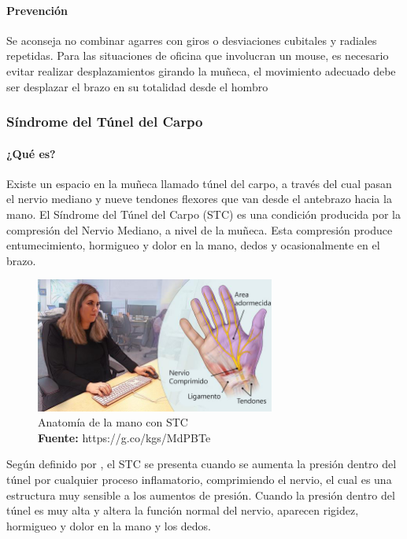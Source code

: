\paragraph{Prevención}
Se aconseja no combinar agarres con giros o desviaciones cubitales y radiales repetidas. Para las situaciones de oficina que involucran un mouse, es necesario evitar realizar desplazamientos girando la muñeca, el movimiento adecuado debe ser desplazar el brazo en su totalidad desde el hombro
\subsubsection{Síndrome del Túnel del Carpo}
\paragraph{¿Qué es?}
Existe un espacio en la muñeca llamado túnel del carpo, a través del cual pasan el nervio mediano y nueve tendones flexores que van desde el antebrazo hacia la mano. El Síndrome del Túnel del Carpo (STC) es una condición producida por la compresión del Nervio Mediano, a nivel de la muñeca. Esta compresión produce entumecimiento, hormigueo y dolor en la mano, dedos y ocasionalmente en el brazo. \parencite{INSHT2017SindromeCarpiano}

\begin{figure}[H]
    \centering
    \includegraphics[width=0.7\textwidth]{Anexos/LATEX/chapters/images/STC.jpg}
    \caption{Anatomía de la mano con STC \\\textbf{Fuente:} https://g.co/kgs/MdPBTe}
    \label{STC}
\end{figure}

Según definido por \parencite{INSHT2017SindromeCarpiano}, el STC se presenta cuando se aumenta la presión dentro del túnel por cualquier proceso inflamatorio, comprimiendo el nervio, el cual es una estructura muy sensible a los aumentos de presión. Cuando la presión dentro del túnel es muy alta y altera la función normal del nervio, aparecen rigidez, hormigueo y dolor en la mano y los dedos.
